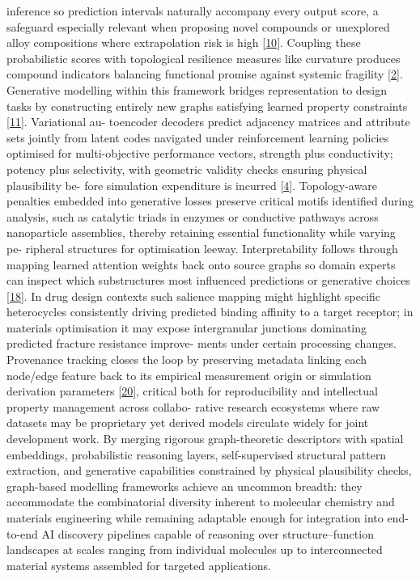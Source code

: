 \documentclass[
]{article}
\begin{document}
inference so prediction intervals naturally accompany every output
score, a safeguard especially relevant when proposing novel compounds or
unexplored alloy compositions where extrapolation risk is high
{[}\protect\hyperlink{_bookmark50}{10}{]}. Coupling these probabilistic
scores with topological resilience measures like curvature produces
compound indicators balancing functional promise against systemic
fragility {[}\protect\hyperlink{_bookmark42}{2}{]}. Generative modelling
within this framework bridges representation to design tasks by
constructing entirely new graphs satisfying learned property constraints
{[}\protect\hyperlink{_bookmark51}{11}{]}. Variational au- toencoder
decoders predict adjacency matrices and attribute sets jointly from
latent codes navigated under reinforcement learning policies optimised
for multi-objective performance vectors, strength plus conductivity;
potency plus selectivity, with geometric validity checks ensuring
physical plausibility be- fore simulation expenditure is incurred
{[}\protect\hyperlink{_bookmark44}{4}{]}. Topology-aware penalties
embedded into generative losses preserve critical motifs identified
during analysis, such as catalytic triads in enzymes or conductive
pathways across nanoparticle assemblies, thereby retaining essential
functionality while varying pe- ripheral structures for optimisation
leeway. Interpretability follows through mapping learned attention
weights back onto source graphs so domain experts can inspect which
substructures most influenced predictions or generative choices
{[}\protect\hyperlink{_bookmark58}{18}{]}. In drug design contexts such
salience mapping might highlight specific heterocycles consistently
driving predicted binding affinity to a target receptor; in materials
optimisation it may expose intergranular junctions dominating predicted
fracture resistance improve- ments under certain processing changes.
Provenance tracking closes the loop by preserving metadata linking each
node/edge feature back to its empirical measurement origin or simulation
derivation parameters {[}\protect\hyperlink{_bookmark60}{20}{]},
critical both for reproducibility and intellectual property management
across collabo- rative research ecosystems where raw datasets may be
proprietary yet derived models circulate widely for joint development
work. By merging rigorous graph-theoretic descriptors with spatial
embeddings, probabilistic reasoning layers, self-supervised structural
pattern extraction, and generative capabilities constrained by physical
plausibility checks, graph-based modelling frameworks achieve an
uncommon breadth: they accommodate the combinatorial diversity inherent
to molecular chemistry and materials engineering while remaining
adaptable enough for integration into end-to-end AI discovery pipelines
capable of reasoning over structure--function landscapes at scales
ranging from individual molecules up to interconnected material systems
assembled for targeted applications.
\end{document}
